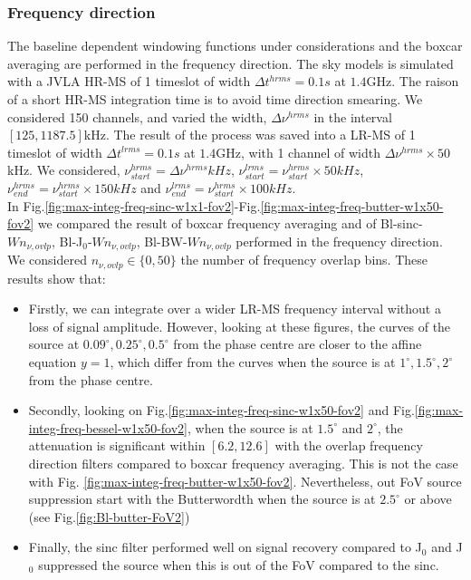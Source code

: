 \documentclass[useAMS,usenatbib]{mn2e}
\begin{document}
\subsubsection{Frequency direction}
The baseline dependent windowing functions under considerations and the boxcar averaging are performed in the frequency direction.
The sky models is simulated with a JVLA HR-MS of 1 timeslot of width $\Delta t^{hrms}=0.1s$ at $1.4$GHz. The raison of a short HR-MS 
integration time is to avoid time direction smearing. We considered 150 channels, and varied the width, $\Delta \nu^{hrms}$ in the interval 
$[125,1187.5]$kHz. The result of the process was saved into a LR-MS of 1 timeslot of width $\Delta t^{lrms}=0.1s$ at $1.4$GHz, with 1 
channel of width $\Delta \nu^{hrms}\times50$kHz. We considered, $\nu^{hrms}_{start}=\Delta \nu^{hrms}kHz$, 
$\nu^{lrms}_{start}=\nu^{hrms}_{start}\times50 kHz$, $\nu^{hrms}_{end}=\nu^{hrms}_{start}\times150 kHz$ and 
$\nu^{lrms}_{end}=\nu^{hrms}_{start}\times100 kHz$.\\
In Fig.\ref{fig:max-integ-freq-sinc-w1x1-fov2}-Fig.\ref{fig:max-integ-freq-butter-w1x50-fov2} we compared the result of boxcar frequency 
averaging and of  Bl-sinc-$W n_{\nu,ovlp}$, Bl-J$_0$-$W n_{\nu,ovlp}$, Bl-BW-$W n_{\nu,ovlp}$ performed in the frequency 
direction. We considered $n_{\nu,ovlp}\in\{0,50\}$ the number of frequency overlap bins. These results show that:
\begin{itemize}
 \item Firstly,  we can integrate over a wider LR-MS frequency interval without a loss of signal 
amplitude. However, looking at these figures, the curves of the source at $0.09^{\circ},0.25^{\circ},0.5^{\circ}$ from the phase centre are 
closer to the affine equation $y=1$, which differ from the curves when the source is at $1^{\circ},1.5^{\circ}, 2^{\circ}$ from the phase 
centre.  
 \item Secondly, looking on Fig.\ref{fig:max-integ-freq-sinc-w1x50-fov2} and Fig.\ref{fig:max-integ-freq-bessel-w1x50-fov2}, when the source 
is at $1.5^{\circ}$ and $2^{\circ}$, the attenuation is significant within 
$[6.2,12.6]$ with the overlap frequency direction filters compared to boxcar frequency averaging. This is not the case with Fig.
\ref{fig:max-integ-freq-butter-w1x50-fov2}. Nevertheless, out FoV source suppression start with the Butterwordth when the source is at 
$2.5^{\circ}$ or above (see Fig.\ref{fig:Bl-butter-FoV2}) 
 \item Finally, the sinc filter performed well on signal recovery compared to J$_0$ and J$_0$ suppressed 
the source when this is out of the FoV compared to the sinc.  
\end{itemize}
\end{document}
